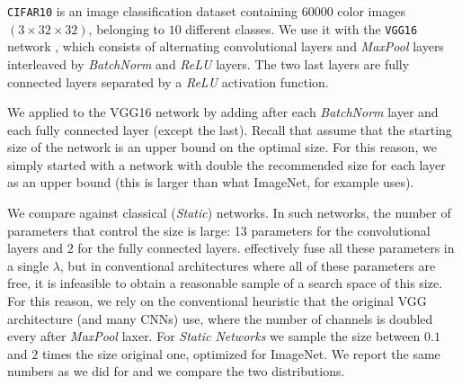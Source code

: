 \texttt{CIFAR10} is an image classification dataset containing $60000$ color
images $(3 \times 32 \times 32)$, belonging to $10$ different classes. We use it
with the \texttt{VGG16} network \cite{Srivastava2014}, which consists of
alternating convolutional layers and \textit{MaxPool} layers interleaved by
\textit{BatchNorm} \cite{DBLP:journals/corr/IoffeS15} and \textit{ReLU}
\cite{Nair2010}  layers.  The two last layers are fully connected layers
separated by a \textit{ReLU} activation function.


We applied \shrink to the VGG16 network by adding \swls
after each \textit{BatchNorm} layer and each fully connected layer (except the
last).  Recall that \shrink assume that the starting size of the network is
an upper bound on the optimal size. For this reason, we simply started with a
network with double the recommended size for each layer as an upper bound (this
is larger than what ImageNet, for example uses). 

We compare against classical (\textit{Static}) networks. In such networks, the
number of parameters that control the size is large: 13 parameters for the
convolutional layers and $2$ for the fully connected layers. \shrink
effectively fuse all these parameters in a single $\lambda$, but in conventional
architectures where all of these parameters are free, it is infeasible to obtain
a reasonable sample of a search space of this size. For this reason, we rely on
the conventional heuristic that the original VGG architecture (and many CNNs)
use, where the number of channels is doubled every after \textit{MaxPool} laxer.
For \textit{Static Networks} we sample the size between $0.1$ and $2$ times the size
original one, optimized for ImageNet. We report the same numbers as we did for
\shrink and we compare the two distributions. 

